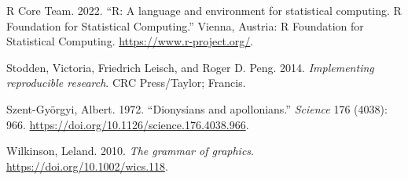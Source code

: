 \documentclass[smallextended]{svjour3}       %
\newlength{\cslhangindent}
\newlength{\cslentryspacingunit} %
\newenvironment{CSLReferences}[2] %
 {%
  \setlength{\parindent}{0pt}
  \ifodd #1
  \let\oldpar\par
  \def\par{\hangindent=\cslhangindent\oldpar}
  \fi
  \setlength{\parskip}{#2\cslentryspacingunit}
 }%
 {}
\begin{document}
\begin{CSLReferences}{1}{0}
\leavevmode{}%
R Core Team. 2022. {``{R: A language and environment for statistical computing. R Foundation for Statistical Computing}.''} Vienna, Austria: R Foundation for Statistical Computing. \url{https://www.r-project.org/}.

\leavevmode{}%
Stodden, Victoria, Friedrich Leisch, and Roger D. Peng. 2014. \emph{{Implementing reproducible research}}. CRC Press/Taylor; Francis.

\leavevmode{}%
Szent-Györgyi, Albert. 1972. {``{Dionysians and apollonians}.''} \emph{Science} 176 (4038): 966. \url{https://doi.org/10.1126/science.176.4038.966}.

\leavevmode{}%
Wilkinson, Leland. 2010. \emph{{The grammar of graphics}}. \url{https://doi.org/10.1002/wics.118}.

\end{CSLReferences}




\end{document}
